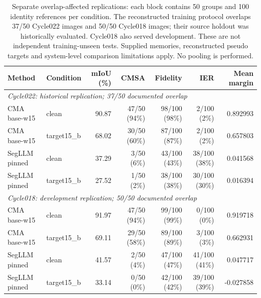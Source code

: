 \begin{table}[t]
\centering
\small
\setlength{\tabcolsep}{4pt}
\caption{Separate overlap-affected replications: each block contains 50 groups and
100 identity references per condition. The reconstructed training protocol overlaps
37/50 Cycle022 images and 50/50 Cycle018 images; their source holdout was historically
evaluated. Cycle018 also served development. These are not independent training-unseen
tests. Supplied memories, reconstructed pseudo targets and system-level comparison
limitations apply. No pooling is performed.}
\label{tab:overlap-replications}
\begin{tabular}{llrrrrr}
\toprule
Method & Condition & mIoU (\%) & CMSA & Fidelity & IER & Mean margin \\
\midrule
\multicolumn{7}{l}{\textit{Cycle022: historical replication; 37/50 documented overlap}} \\
CMA base-w15 & clean & 90.87 & 47/50 (94\%) & 98/100 (98\%) & 2/100 (2\%) & 0.892993 \\
CMA base-w15 & target15\_b & 68.02 & 30/50 (60\%) & 87/100 (87\%) & 2/100 (2\%) & 0.657803 \\
SegLLM pinned & clean & 37.29 & 3/50 (6\%) & 43/100 (43\%) & 38/100 (38\%) & 0.041568 \\
SegLLM pinned & target15\_b & 27.52 & 1/50 (2\%) & 38/100 (38\%) & 30/100 (30\%) & 0.016394 \\
\midrule
\multicolumn{7}{l}{\textit{Cycle018: development replication; 50/50 documented overlap}} \\
CMA base-w15 & clean & 91.97 & 47/50 (94\%) & 99/100 (99\%) & 0/100 (0\%) & 0.919718 \\
CMA base-w15 & target15\_b & 69.11 & 29/50 (58\%) & 89/100 (89\%) & 3/100 (3\%) & 0.662931 \\
SegLLM pinned & clean & 41.57 & 2/50 (4\%) & 47/100 (47\%) & 41/100 (41\%) & 0.047717 \\
SegLLM pinned & target15\_b & 33.14 & 0/50 (0\%) & 42/100 (42\%) & 39/100 (39\%) & -0.027858 \\
\bottomrule
\end{tabular}
\end{table}

